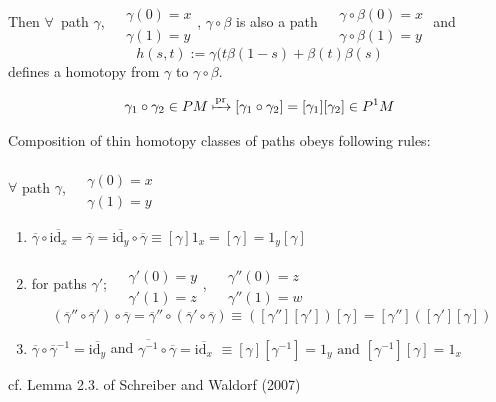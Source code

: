 Then $\forall \, $ path $\gamma$, $\begin{aligned} & \quad \\ 
& \gamma(0) = x \\
& \gamma(1) = y \end{aligned}$, $\gamma \circ \beta$ is also a path $\begin{aligned} & \quad \\ 
& \gamma\circ \beta(0) = x \\
& \gamma\circ \beta(1) = y \end{aligned}$ and 
\begin{equation}
h(s,t) := \gamma(t\beta(1-s) + \beta(t) \beta(s)
\end{equation}
defines a homotopy from $\gamma$ to $\gamma \circ \beta$.

\[
\gamma_1 \circ \gamma_2 \in PM \xmapsto{\text{pr}} [\gamma_1 \circ \gamma_2] = [\gamma_1][ \gamma_2] \in P^1M
\]

Composition of thin homotopy classes of paths obeys following rules:
\begin{lemma}\label{dgdt:Eq:CompositionOfThinHomotopyClassesOfPaths}
$\forall$ path $\gamma$, $\begin{aligned} & \quad \\ 
& \gamma(0) = x \\
& \gamma(1) = y \end{aligned}$
\begin{enumerate}
	\item $\overline{\gamma} \circ \overline{\text{id}_x} = \overline{\gamma} = \overline{\text{id}_y} \circ \overline{\gamma} \equiv [\gamma]1_x = [\gamma] = 1_y [\gamma] $ 
	\item for paths $\gamma'$; $\begin{aligned} & \quad \\ 
		& \gamma'(0) = y \\
		& \gamma'(1) = z \end{aligned}$, \quad $\begin{aligned} & \quad \\ 
	& \gamma''(0) = z \\
& \gamma''(1) = w \end{aligned}$
\begin{equation}
(\overline{\gamma}'' \circ \overline{\gamma}') \circ \overline{\gamma} = \overline{\gamma}'' \circ (\overline{\gamma}' \circ \overline{\gamma}) \equiv ( [\gamma''][\gamma'])[\gamma] = [\gamma'']([\gamma'][\gamma])
\end{equation}
\item $\overline{\gamma} \circ \overline{\gamma}^{-1} = \overline{\text{id}_y}$ and $\overline{\gamma^{-1}} \circ \overline{\gamma} = \overline{\text{id}_x}$ $\equiv [\gamma] [\gamma^{-1}] = 1_y \text{ and } [\gamma^{-1}][\gamma] = 1_x$
\end{enumerate} 	
\end{lemma}
cf. Lemma 2.3. of Schreiber and Waldorf (2007)\cite{dgdt:ScWa2007}  

